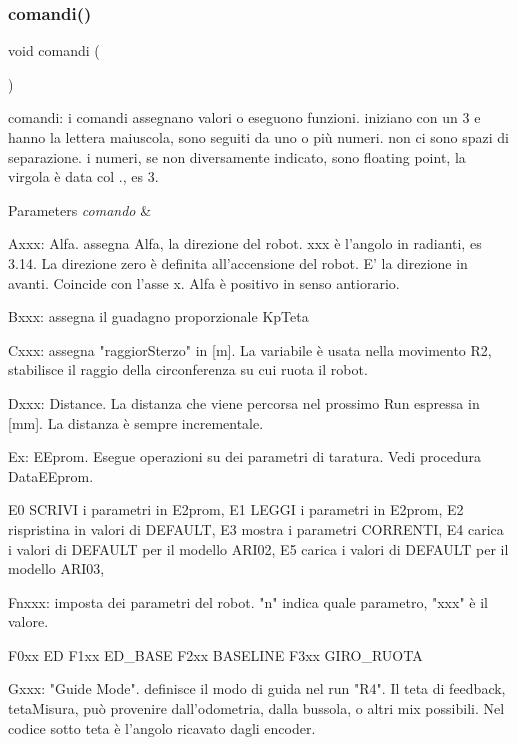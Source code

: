 \subsubsection{\texorpdfstring{comandi()}{comandi()}}
{\footnotesize\ttfamily void comandi (\begin{DoxyParamCaption}{ }\end{DoxyParamCaption})}



comandi\+: i comandi assegnano valori o eseguono funzioni. iniziano con un 3 e hanno la lettera maiuscola, sono seguiti da uno o più numeri. non ci sono spazi di separazione. i numeri, se non diversamente indicato, sono floating point, la virgola è data col \textquotesingle{}.\textquotesingle{}, es 3. 


\begin{DoxyParams}{Parameters}
{\em comando} & \begin{DoxyVerb}Axxx: Alfa. assegna Alfa, la direzione del robot. xxx è l'angolo in radianti, es 3.14. La direzione zero è definita all'accensione del robot. E' la direzione in avanti. Coincide con l'asse x.
        Alfa è positivo in senso antiorario.

Bxxx: assegna il guadagno proporzionale KpTeta

Cxxx: assegna "raggiorSterzo" in [m]. La variabile è usata nella movimento R2, stabilisce il raggio della circonferenza su cui ruota il robot.

Dxxx: Distance. La distanza che viene percorsa nel prossimo Run espressa in [mm]. La distanza è sempre incrementale. 

Ex: EEprom.  Esegue operazioni su dei parametri di taratura. Vedi procedura DataEEprom. 

    E0 SCRIVI i parametri in E2prom,            
    E1 LEGGI i parametri in E2prom,             
    E2 rispristina in valori di DEFAULT,            
    E3 mostra i parametri CORRENTI,             
    E4 carica i valori di DEFAULT per il modello ARI02,             
    E5 carica i valori di DEFAULT per il modello ARI03, 

Fnxxx: imposta dei parametri del robot. "n" indica quale parametro, "xxx" è il valore. 

    F0xx ED         
    F1xx ED_BASE            
    F2xx BASELINE           
    F3xx GIRO_RUOTA

Gxxx:   "Guide Mode". definisce il modo di guida nel run "R4". Il teta di feedback, tetaMisura, può provenire dall'odometria, dalla bussola, o altri mix possibili.
        Nel codice sotto teta è l'angolo ricavato dagli encoder.


\end{DoxyVerb}
\end{DoxyParams}
